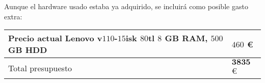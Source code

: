 \hfill \break
Aunque el hardware usado estaba ya adquirido, se incluirá como posible gasto extra:\\

\begin{tabular}{| p{6cm} | p{1cm} |}
\hline
Precio actual Lenovo v$110$-$15$isk $80$tl $8$ GB RAM, $500$ GB HDD& $460$ €\\
\hline
Total presupuesto & $\boldsymbol{3835}$ €\\
\hline
\end{tabular}

\endinput
